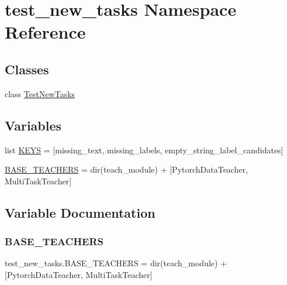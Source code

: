 \hypertarget{namespacetest__new__tasks}{}\section{test\+\_\+new\+\_\+tasks Namespace Reference}
\label{namespacetest__new__tasks}
\subsection*{Classes}
\begin{DoxyCompactItemize}
\item 
class \hyperlink{classtest__new__tasks_1_1TestNewTasks}{Test\+New\+Tasks}
\end{DoxyCompactItemize}
\subsection*{Variables}
\begin{DoxyCompactItemize}
\item 
list \hyperlink{namespacetest__new__tasks_a78b0338511b7541b8771ad9d6c223fb7}{K\+E\+YS} = \mbox{[}\textquotesingle{}missing\+\_\+text\textquotesingle{}, \textquotesingle{}missing\+\_\+labels\textquotesingle{}, \textquotesingle{}empty\+\_\+string\+\_\+label\+\_\+candidates\textquotesingle{}\mbox{]}
\item 
\hyperlink{namespacetest__new__tasks_a31c7cb948ec33fba2b271b92281bab47}{B\+A\+S\+E\+\_\+\+T\+E\+A\+C\+H\+E\+RS} = dir(teach\+\_\+module) + \mbox{[}\textquotesingle{}Pytorch\+Data\+Teacher\textquotesingle{}, \textquotesingle{}Multi\+Task\+Teacher\textquotesingle{}\mbox{]}
\end{DoxyCompactItemize}


\subsection{Variable Documentation}
\mbox{\label{namespacetest__new__tasks_a31c7cb948ec33fba2b271b92281bab47}} 
\subsubsection{\texorpdfstring{B\+A\+S\+E\+\_\+\+T\+E\+A\+C\+H\+E\+RS}{BASE\_TEACHERS}}
{\footnotesize\ttfamily test\+\_\+new\+\_\+tasks.\+B\+A\+S\+E\+\_\+\+T\+E\+A\+C\+H\+E\+RS = dir(teach\+\_\+module) + \mbox{[}\textquotesingle{}Pytorch\+Data\+Teacher\textquotesingle{}, \textquotesingle{}Multi\+Task\+Teacher\textquotesingle{}\mbox{]}}



